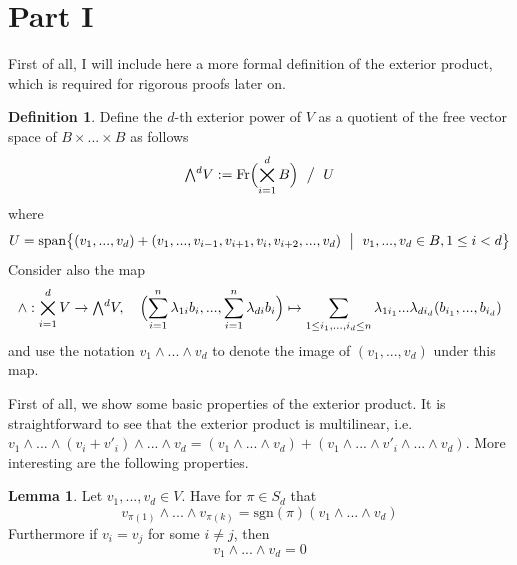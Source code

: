 \documentclass{scrartcl}
\newcommand{\sgn}{\mathrm{sgn}}
\newcommand{\extpow}{\mathchoice{{\textstyle\bigwedge}}
    {{\bigwedge}}
    {{\textstyle\wedge}}
    {{\scriptstyle\wedge}}}
\newcommand{\vspan}{\mathrm{span}}
\theoremstyle{definition}
\newtheorem{definition}[subsection]{Definition}
\newtheorem{lemma}[subsection]{Lemma}
\begin{document}
\section{Part I}
First of all, I will include here a more formal definition of the exterior product, which is required for rigorous proofs later on.
\begin{definition}
    Define the $d$-th exterior power of $V$ as a quotient of the free vector space of $B \times ... \times B$ as follows
    \begin{align*}
        \extpow^d V := \mathrm{Fr}\Bigl(\bigtimes_{i = 1}^d B\Bigr) \ \bigm/ \ U
    \end{align*}
    where
    \begin{align*}
        U = \vspan \bigl\{ (v_1, ..., v_d) + (v_1, ..., v_{i - 1}, v_{i + 1}, v_i, v_{i + 2}, ..., v_d) \ \bigm| \ v_1, ..., v_d \in B, 1 \leq i < d \bigr\}
    \end{align*}
    Consider also the map
    \begin{equation*}
        \wedge: \bigtimes_{i = 1}^d V \to \extpow^d V, \quad \Bigl( \sum_{i = 1}^n \lambda_{1i} b_i, ..., \sum_{i = 1}^n \lambda_{di} b_i \Bigr) \mapsto \sum_{1 \leq i_1, ..., i_d \leq n} \lambda_{1i_1} ... \lambda_{di_d} (b_{i_1}, ..., b_{i_d})
    \end{equation*}
    and use the notation $v_1 \wedge ... \wedge v_d$ to denote the image of $(v_1, ..., v_d)$ under this map.
\end{definition}
First of all, we show some basic properties of the exterior product.
It is straightforward to see that the exterior product is multilinear, i.e. $v_1 \wedge ... \wedge (v_i + v'_i) \wedge ... \wedge v_d = (v_1 \wedge ... \wedge v_d) + (v_1 \wedge ... \wedge v'_i \wedge ... \wedge v_d)$.
More interesting are the following properties.
\begin{lemma}
    \label{prop:basic_properties_exterior_product}
    Let $v_1, ..., v_d \in V$. Have for $\pi \in S_d$ that
    \begin{equation*}
        v_{\pi(1)} \wedge ... \wedge v_{\pi(k)} = \sgn(\pi) (v_1 \wedge ... \wedge v_d)
    \end{equation*}
    Furthermore if $v_i = v_j$ for some $i \neq j$, then
    \begin{equation*}
        v_1 \wedge ... \wedge v_d = 0
    \end{equation*}
\end{lemma}
\end{document}
